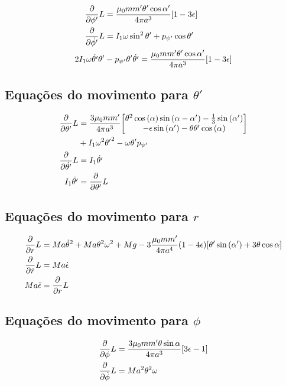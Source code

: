 \documentclass[a4paper, 12pt]{article}
\begin{document}
\begin{align}
    \pdv{}{\phi'}L&=\frac{\mu_0mm'\theta'\cos\alpha'}{4\pi a^3}\qty[1-3\epsilon]\nonumber\\
    \pdv{}{\dot{\phi'}}L&=I_1\omega\sin^2\theta'+p_{\psi'}\cos\theta'\nonumber\\
    2I_1\omega\dot{\theta'}\theta'&-p_{\psi'}\theta'\dot{\theta'}=\frac{\mu_0mm'\theta'\cos\alpha'}{4\pi a^3}\qty[1-3\epsilon]\nonumber\\
\end{align}

\subsection{Equações do movimento para $\theta'$}

\begin{align}
    \pdv{}{\theta'}L&=\frac{3\mu_0mm'}{4\pi a^3}\mqty[\theta^2\cos\qty(\alpha)\sin\qty(\alpha-\alpha')-\frac13\sin\qty(\alpha')\\
    -\epsilon\sin\qty(\alpha')-\theta\theta'\cos\qty(\alpha)]\nonumber\\
    &+I_1\omega^2{\theta'}^2-\omega\theta'p_{\psi'}\nonumber\\
    \pdv{}{\dot{\theta'}}L&=I_1\dot{\theta'}\nonumber\\
    I_1\ddot{\theta'}&=\pdv{}{\theta'}L
\end{align}

\subsection{Equações do movimento para $r$}

\begin{align}
    \pdv{}{r}L&=Ma\dot{\theta}^2+Ma\theta^2\omega^2+Mg-3\frac{\mu_0mm'}{4\pi a^4}\qty(1-4\epsilon)\qty[\theta'\sin\qty(\alpha')+3\theta\cos\alpha]\nonumber\\
    \pdv{}{\dot{r}}L&=Ma\dot{\epsilon}\nonumber\\
    Ma\ddot{\epsilon}&=\pdv{}{r}L
\end{align}

\subsection{Equações do movimento para $\phi$}

\begin{align}
    \pdv{}{\phi}L&=\frac{3\mu_0mm'\theta\sin\alpha}{4\pi a^3}\qty[3\epsilon-1]\nonumber\\
    \pdv{}{\dot{\phi}}L&=Ma^2\theta^2\omega\nonumber
\end{align}
\end{document}
